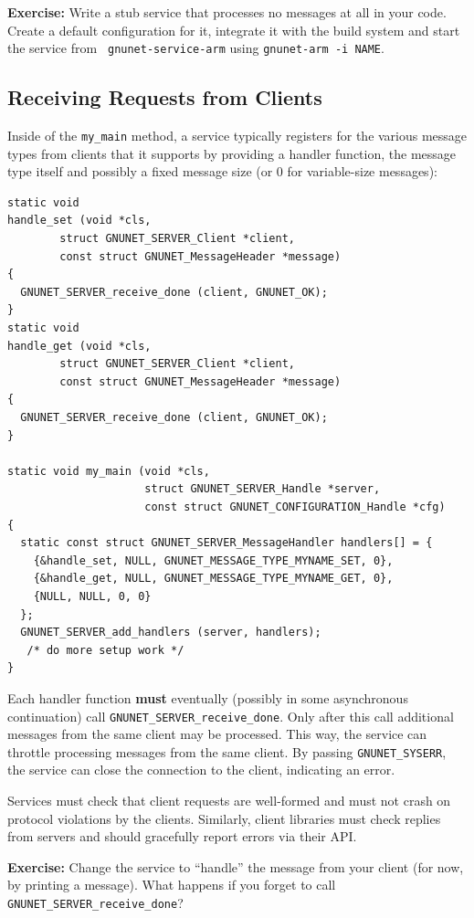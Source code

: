 \documentclass[10pt]{article}
\newcommand{\exercise}[1]{\noindent\begin{boxedminipage}{\textwidth}{\bf Exercise:} #1 \end{boxedminipage}}
\begin{document}
\exercise{Write a stub service that processes no messages at all
in your code.  Create a default configuration for it, integrate it
with the build system and start the service from {\tt
  gnunet-service-arm} using {\tt gnunet-arm -i NAME}.}


\subsection{Receiving Requests from Clients}

Inside of the {\tt my\_main} method, a service typically registers for
the various message types from clients that it supports by providing
a handler function, the message type itself and possibly a fixed
message size (or 0 for variable-size messages):

\lstset{language=c}
\begin{lstlisting}
static void
handle_set (void *cls,
	    struct GNUNET_SERVER_Client *client,
	    const struct GNUNET_MessageHeader *message)
{
  GNUNET_SERVER_receive_done (client, GNUNET_OK); 
}
static void
handle_get (void *cls,
	    struct GNUNET_SERVER_Client *client,
	    const struct GNUNET_MessageHeader *message)
{
  GNUNET_SERVER_receive_done (client, GNUNET_OK); 
}

static void my_main (void *cls,
                     struct GNUNET_SERVER_Handle *server,
                     const struct GNUNET_CONFIGURATION_Handle *cfg)
{ 
  static const struct GNUNET_SERVER_MessageHandler handlers[] = {
    {&handle_set, NULL, GNUNET_MESSAGE_TYPE_MYNAME_SET, 0},
    {&handle_get, NULL, GNUNET_MESSAGE_TYPE_MYNAME_GET, 0},
    {NULL, NULL, 0, 0}
  };
  GNUNET_SERVER_add_handlers (server, handlers);
   /* do more setup work */  
} 
\end{lstlisting}

Each handler function {\bf must} eventually (possibly in some
asynchronous continuation) call {\tt GNUNET\_SERVER\_receive\_done}.
Only after this call additional messages from the same client may
be processed. This way, the service can throttle processing messages
from the same client.  By passing {\tt GNUNET\_SYSERR}, the service
can close the connection to the client, indicating an error.

Services must check that client requests are well-formed and must not
crash on protocol violations by the clients.  Similarly, client
libraries must check replies from servers and should gracefully report
errors via their API.


\exercise{Change the service to ``handle'' the message from your
client (for now, by printing a message).  What happens if you
forget to call {\tt GNUNET\_SERVER\_receive\_done}?}
\end{document}
